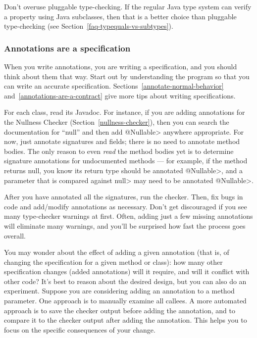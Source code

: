 Don't overuse pluggable type-checking.  If the regular Java type system can
verify a property using Java subclasses, then that is a better choice than
pluggable type-checking (see Section~\ref{faq-typequals-vs-subtypes}).


\subsubsection{Annotations are a specification\label{get-started-annotations-are-a-specification}}

When you write annotations, you are writing a specification, and you should
think about them that way.  Start out by understanding the program so that
you can write an accurate specification.
Sections~\ref{annotate-normal-behavior}
and~\ref{annotations-are-a-contract} give more tips about writing
specifications.

For each class, read its Javadoc.  For instance, if you are adding
annotations for the Nullness Checker (Section~\ref{nullness-checker}), then
you can search the documentation for ``null'' and then add \<@Nullable>
anywhere appropriate.  For now, just annotate signatures and fields; there is no
need to annotate method bodies.  The only reason to even
\emph{read} the method bodies yet is to determine signature annotations for
undocumented methods ---
for example, if the method returns null, you know its return type should be
annotated \<@Nullable>, and a parameter that is compared against \<null>
may need to be annotated \<@Nullable>.

After you have annotated all the signatures, run the checker.
Then, fix bugs in code and add/modify annotations as necessary.
Don't get discouraged if you see many type-checker warnings at first.
Often, adding just a few missing annotations will eliminate many warnings,
and you'll be surprised how fast the process goes overall.

You may wonder about the effect of adding a given annotation (that is, of
changing the specification for a given method or class):  how many
other specification changes (added annotations) will it require, and will
it conflict with other code?  It's best to reason about the desired design,
but you can also do an experiment.
Suppose you are considering adding an annotation to a method parameter.
One approach is to manually examine all callees.
A more automated approach is to save the checker
output before adding the annotation, and to compare it to the checker
output after adding the annotation.  This helps you to focus on the
specific consequences of your change.


